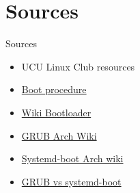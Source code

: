 \documentclass[usenames,dvipsnames,10pt,aspectratio=169]{beamer}
\begin{document}
\section{Sources}
\begin{frame}{Sources}
    \begin{itemize}
        \item UCU Linux Club resources
        \item \href{https://www.freecodecamp.org/news/uefi-vs-bios/}{Boot procedure}
        \item \href{https://en.wikipedia.org/wiki/Bootloader}{Wiki Bootloader}
        \item \href{https://wiki.archlinux.org/title/GRUB}{GRUB Arch Wiki}
        \item \href{https://wiki.archlinux.org/title/Systemd-boot}{Systemd-boot Arch wiki}
        \item \href{https://www.maketecheasier.com/grub-vs-systemd-boot/}{GRUB vs systemd-boot}
    \end{itemize}
\end{frame}
\end{document}
